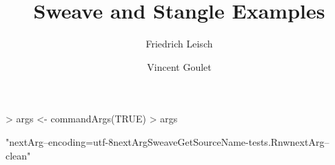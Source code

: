 \documentclass[a4paper]{article}
\title{Sweave and Stangle Examples}
\author{Friedrich Leisch \and Vincent Goulet}
\begin{document}
\begin{Schunk}
\begin{Sinput}
> args <- commandArgs(TRUE)
> args
\end{Sinput}
\begin{Soutput}
[1] "nextArg--encoding=utf-8nextArgSweaveGetSourceName-tests.RnwnextArg--clean"
\end{Soutput}
\end{Schunk}
\end{document}
